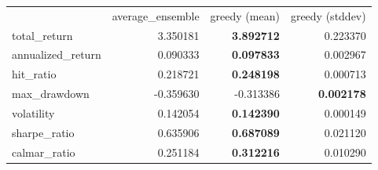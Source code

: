 \begin{tabular}{lrrr}
 & average_ensemble & greedy (mean) & greedy (stddev) \\
total_return & 3.350181 & \bfseries 3.892712 & 0.223370 \\
annualized_return & 0.090333 & \bfseries 0.097833 & 0.002967 \\
hit_ratio & 0.218721 & \bfseries 0.248198 & 0.000713 \\
max_drawdown & -0.359630 & -0.313386 & \bfseries 0.002178 \\
volatility & 0.142054 & \bfseries 0.142390 & 0.000149 \\
sharpe_ratio & 0.635906 & \bfseries 0.687089 & 0.021120 \\
calmar_ratio & 0.251184 & \bfseries 0.312216 & 0.010290 \\
\end{tabular}
